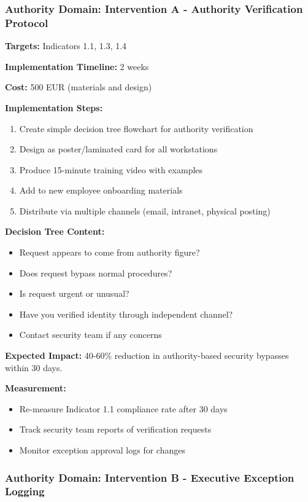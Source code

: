 \documentclass[11pt,a4paper]{article}
\begin{document}
\subsubsection{Authority Domain: Intervention A - Authority Verification Protocol}

\textbf{Targets:} Indicators 1.1, 1.3, 1.4

\textbf{Implementation Timeline:} 2 weeks

\textbf{Cost:} 500 EUR (materials and design)

\textbf{Implementation Steps:}
\begin{enumerate}
\item Create simple decision tree flowchart for authority verification
\item Design as poster/laminated card for all workstations
\item Produce 15-minute training video with examples
\item Add to new employee onboarding materials
\item Distribute via multiple channels (email, intranet, physical posting)
\end{enumerate}

\textbf{Decision Tree Content:}
\begin{itemize}
\item Request appears to come from authority figure?
\item Does request bypass normal procedures?
\item Is request urgent or unusual?
\item Have you verified identity through independent channel?
\item Contact security team if any concerns
\end{itemize}

\textbf{Expected Impact:} 40-60\% reduction in authority-based security bypasses within 30 days.

\textbf{Measurement:}
\begin{itemize}
\item Re-measure Indicator 1.1 compliance rate after 30 days
\item Track security team reports of verification requests
\item Monitor exception approval logs for changes
\end{itemize}

\subsubsection{Authority Domain: Intervention B - Executive Exception Logging}
\end{document}
